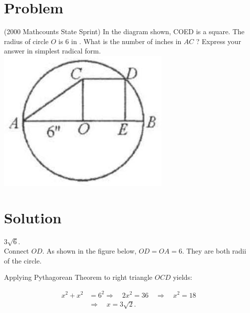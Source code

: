 \documentclass{article}
\begin{document}
\section*{Problem}
(2000 Mathcounts State Sprint) In the diagram shown, COED is a square. The radius of circle \(O\) is 6 in . What is the number of inches in \(A C\) ? Express your answer in simplest radical form.\\
\centering
\includegraphics[width=\textwidth]{images/155.jpg}

\section*{Solution}
\(3 \sqrt{6}\).\\
Connect \(O D\). As shown in the figure below, \(O D=O A=6\). They are both radii of the circle.

Applying Pythagorean Theorem to right triangle \(O C D\) yields:

\[
\begin{aligned}
x^{2}+x^{2} & =6^{2} \Rightarrow \quad 2 x^{2}=36 \quad \Rightarrow \quad x^{2}=18 \\
& \Rightarrow \quad x=3 \sqrt{2} .
\end{aligned}
\]
\end{document}
